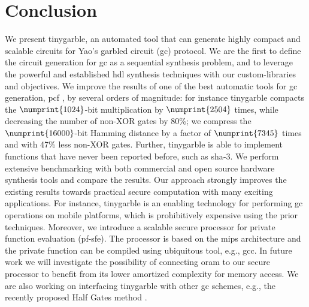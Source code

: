 \chapter{Conclusion}\label{chap:conclusion}
We present \gls{tinygarble}, an automated tool that can generate highly compact and scalable circuits for Yao's garbled circuit (\acrshort{gc}) protocol.
We are the first to define the circuit generation for \acrshort{gc} as a sequential synthesis problem, and to leverage the powerful and established \acrshort{hdl} synthesis techniques with our custom-libraries and objectives.
We improve the results of one of the best automatic tools for \acrshort{gc} generation, \gls{pcf} \cite{kreuter2013pcf}, by several orders of magnitude: for instance \gls{tinygarble} compacts the $\numprint{1024}$-bit multiplication by $\numprint{2504}$ times, while decreasing the number of non-XOR gates by 80\%; we compress the $\numprint{16000}$-bit Hamming distance by a factor of $\numprint{7345}$ times and with 47\% less non-XOR gates.
Further, \gls{tinygarble} is able to implement functions that have never been reported before, such as \acrshort{sha}-3.
We perform extensive benchmarking with both commercial and open source hardware synthesis tools and compare the results.
Our approach strongly improves the existing results towards practical secure computation with many exciting applications.
For instance, \gls{tinygarble} is an enabling technology for performing \acrshort{gc} operations on mobile platforms, which is prohibitively expensive using the prior techniques.
Moreover, we introduce a scalable secure processor for private function evaluation (\acrshort{pf-sfe}).
The processor is based on the \gls{mips} architecture and the private function can be compiled using ubiquitous tool, e.g., gcc.
In future work we will investigate the possibility of connecting \acrfull{oram} to our secure processor to benefit from its lower amortized complexity for memory access.
We are also working on interfacing \gls{tinygarble} with other \acrshort{gc} schemes, e.g., the recently proposed Half Gates method \cite{zahur2015two}.
